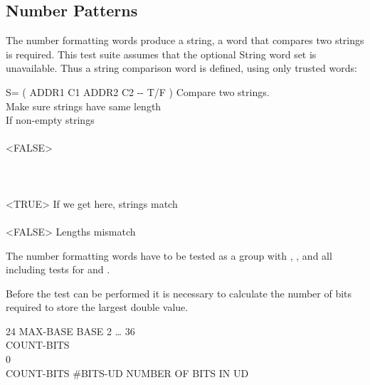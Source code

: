 \subsection{Number Patterns}

The number formatting words produce a string, a word that compares
two strings is required.  This test suite assumes that the optional
String word set is unavailable.  Thus a string comparison word is
defined, using only trusted words:

\begin{tt}
\word{:} S=   ( ADDR1 C1 ADDR2 C2 -{}- T/F ) Compare two strings. \\
\tab  {}   \word{=} 	\tab[4.8]  Make sure strings have same length \\
\tab[2]     				\tab[6.2]  If non-empty strings \\
  \\
\tab[4]           \word{-}
				  <FALSE>    \\
\tab[4]           \\
\tab[3]      \\
\tab[2]    \\
\tab[2]    <TRUE>								\tab[5]  If we get here, strings match \\
\tab  {} \\
\tab[2]      <FALSE>		\tab[-0.4]  Lengths mismatch \\
\tab  {} \word{;}
\end{tt}

The number formatting words have to be tested as a group with
	,
	, and
	 all including tests for
	 and .

Before the  test can be performed it is
necessary to calculate the number of bits required to store the
largest double value.

\begin{tt}
24  MAX-BASE							\tab[7.6]  BASE 2 {\ldots} 36 \\
\word{:} COUNT-BITS \\
 0 
	       
	 \word{;} \\
COUNT-BITS   \#BITS-UD		\tab {} NUMBER OF BITS IN UD
\end{tt}

